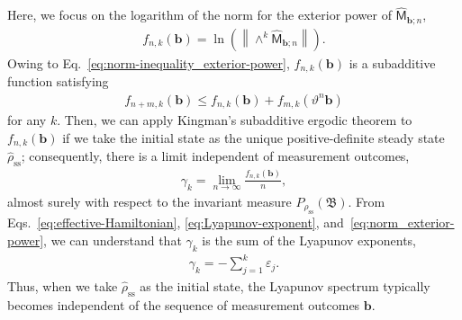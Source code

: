 \documentclass[preprint,pteplogo]{ptephy_v2}%
\numberwithin{equation}{section}
\theoremstyle{definition}
\begin{document}
Here, we focus on the logarithm of the norm for the exterior power of $\hat{\mathsf{M}}_{\bm{b};n}$,
\begin{align}
    f_{n,k}(\bm{b})=\ln\left(\left\|\land^k\hat{\mathsf{M}}_{\bm{b};n}\right\|\right).
    \label{eq:exterior-power_M}
\end{align}
Owing to Eq.~\eqref{eq:norm-inequality_exterior-power}, $f_{n,k}(\bm{b})$ is a subadditive function satisfying
\begin{align}
    f_{n+m,k}(\bm{b}) \leq f_{n,k}(\bm{b})+f_{m,k}(\vartheta^n\bm{b})
    \label{eq:f_subadditive}
\end{align}
for any $k$. 
Then, we can apply Kingman's subadditive ergodic theorem to $f_{n,k}(\bm{b})$ if we take the initial state as the unique positive-definite steady state $\hat{\rho}_\mathrm{ss}$; consequently, there is a limit independent of measurement outcomes,
\begin{align}
    \gamma_k=\lim_{n\rightarrow\infty}
    \frac{f_{n,k}(\bm{b})}{n},
    \label{eq:gamma-k}
\end{align}
almost surely with respect to the invariant measure $P_{\rho_\mathrm{ss}}(\mathfrak{B})$. 
From Eqs.~\eqref{eq:effective-Hamiltonian}, \eqref{eq:Lyapunov-exponent}, and~\eqref{eq:norm_exterior-power}, we can understand that $\gamma_k$ is the sum of the Lyapunov exponents,
\begin{align}
    \gamma_k=-\sum_{j=1}^k\varepsilon_j.
    \label{eq:gamma-k_Lyapunov-exponenets}
\end{align}
Thus, when we take $\hat{\rho}_\mathrm{ss}$ as the initial state, the Lyapunov spectrum typically becomes independent of the sequence of measurement outcomes $\bm{b}$.
\end{document}
